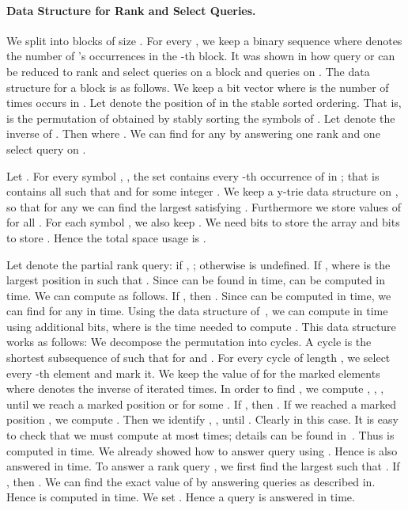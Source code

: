 \documentclass[11pt]{article}\usepackage{fullpage}
\begin{document}
\paragraph{Data Structure for Rank and Select Queries.}
 We split  into blocks of size . For every , we keep a binary sequence 
where  denotes the number of 's occurrences in the -th block. 
It was shown in 
\cite{BHMR07} how query  or   can be reduced to  rank and select queries on a block  and  queries on .
The data structure for a block   is as follows. We keep a bit vector  where  is the number of times  occurs in . Let  denote the 
position of  in the stable sorted ordering. That is,  is the permutation of  
obtained by stably sorting the symbols of . Let  denote the inverse of . Then  where . We can find  for any  by answering one rank and one select query on . 

Let .
For every symbol , , the set   contains every -th occurrence of  in ; that is  contains all  such that  and  for some integer . We keep a y-trie data structure on , so that for any  we can find the largest  satisfying . Furthermore we store  values of  for all . For each symbol , we also keep . We need  bits to store the array  and  bits to store . Hence the total space usage is .

Let  denote the partial rank query: if , ; otherwise  is undefined. If ,  where  is the largest position in  such that . Since  can be found in  time,  can be computed in  time.
We can compute  as follows. If , then . Since  can be computed in  time, we can find  for any  in  time. 
Using the data structure of~\cite{MunroRRR12}, we can compute  in  time using  additional bits, where  is the time needed to compute . This data structure works as follows:
We decompose the permutation  into cycles. A cycle is the shortest subsequence  of  such that  for  and . For every cycle of length , we select every -th element and mark it. We keep the value of  for the marked elements where  denotes the inverse of  iterated  times. In order to find , we compute , , ,  until we reach a marked position  or  for some . If , then . If we reached a marked position , we compute . Then we identify , ,  until . Clearly  in this case. It is easy to check that we must compute  at most  times; details can be found in~\cite{MunroRRR12}.  
Thus  is computed in  time. We already showed how to answer  query using . Hence  is also answered in  time. To answer a rank query , we first find the largest  such that . If , then . We can find the exact value of  by answering   queries as described in\cite{GMR06,BHMR07}. Hence  is computed in  time.  We set . Hence a query  is answered in  time. 
\end{document}
